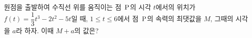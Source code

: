 원점을 출발하여 수직선 위를 움직이는 점~$\mathrm{P}$의 시각 $t$에서의 위치가 $f(t)=\dfrac{1}{3}t^3-2t^2-5t$일 때, $1\le t\le 6$에서 점~$\mathrm{P}$의 속력의 최댓값을 $M$, 그때의 시각을 $a$라 하자. 이때 $M+a$의 값은?
